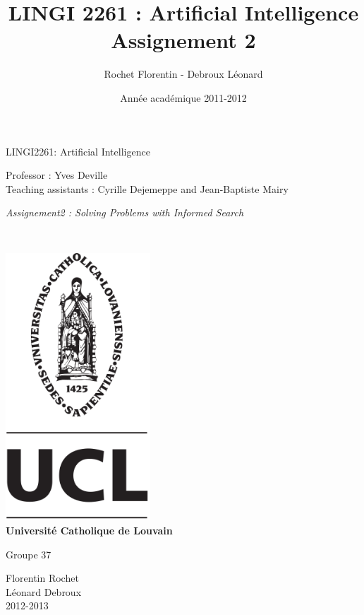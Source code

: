 \documentclass[a4paper,10pt]{article}
\title{LINGI 2261 : Artificial Intelligence \\
Assignement 2}
\author{Rochet Florentin - Debroux Léonard}
\date{Année académique 2011-2012}
\begin{document}
	\begin{titlepage}
		\begin{center}
			{\huge LINGI2261: Artificial Intelligence}\\
			\vspace{0.4cm}
			
			{\Large {Professor : Yves Deville\\ \vspace{0.2cm} Teaching assistants : Cyrille Dejemeppe and Jean-Baptiste Mairy  }}\\
			\vspace{0.6cm}
			
			{\Large \textit{ Assignement2 : Solving Problems with Informed Search}}\\
			\vspace{1.2cm}

			\texttt{}\\
			\vspace{0.2cm}

			\includegraphics[height=10cm]{pageGarde.png}\\
			\vspace{0.1cm}
			{\Large \textbf{Universit\'e Catholique de Louvain}}
			\vspace{0.7cm}

			Groupe 37 \\
			\vspace{0.2cm}
			
			Florentin Rochet \\
			Léonard Debroux\\
			\vspace{0.2cm}
			2012-2013\\
		\end{center}
	\end{titlepage}
\end{document}
